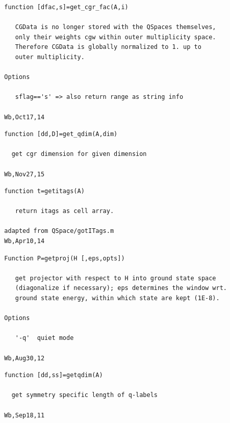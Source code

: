 \documentclass[twoside,12pt]{article}
\begin{document}
\pagebreak[3]



\begin{verbatim}
  function [dfac,s]=get_cgr_fac(A,i)
 
     CGData is no longer stored with the QSpaces themselves,
     only their weights cgw within outer multiplicity space.
     Therefore CGData is globally normalized to 1. up to
     outer multiplicity.
 
  Options
 
     sflag=='s' => also return range as string info
 
  Wb,Oct17,14
\end{verbatim}

\pagebreak[3]



\begin{verbatim}
  function [dd,D]=get_qdim(A,dim)
 
    get cgr dimension for given dimension
 
  Wb,Nov27,15
\end{verbatim}

\pagebreak[3]



\begin{verbatim}
  function t=getitags(A)
 
     return itags as cell array.
 
  adapted from QSpace/gotITags.m
  Wb,Apr10,14
\end{verbatim}

\pagebreak[3]



\begin{verbatim}
  Function P=getproj(H [,eps,opts])
 
     get projector with respect to H into ground state space
     (diagonalize if necessary); eps determines the window wrt.
     ground state energy, within which state are kept (1E-8).
 
  Options
 
     '-q'  quiet mode
 
  Wb,Aug30,12
\end{verbatim}

\pagebreak[3]



\begin{verbatim}
  function [dd,ss]=getqdim(A)
 
    get symmetry specific length of q-labels
 
  Wb,Sep18,11
\end{verbatim}
\end{document}
